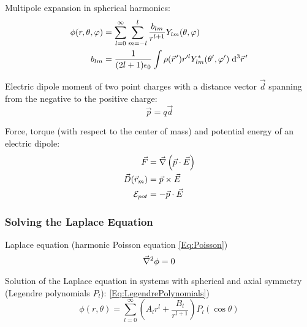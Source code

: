			\noindent
			Multipole expansion in spherical harmonics:
			\begin{equation}
				\begin{aligned}
					\phi(r,\theta,\varphi) &= \sum_{l=0}^{\infty}\sum_{m=-l}^{l} \frac{b_{lm}}{r^{l+1}}Y_{lm}(\theta,\varphi) \\
					b_{lm} &= \frac{1}{(2l+1)\epsilon_0}\int\rho(\pvec{r}')r'^lY^{*}_{lm}(\theta',\varphi')\;\diff^3\pvec{r}'
				\end{aligned}
			\end{equation}

			\noindent
			Electric dipole moment of two point charges with a distance vector $\vec{d}$ spanning from the negative to the positive charge:%
			\begin{equation}
				\vec{p}=q\vec{d}
			\end{equation}

			\noindent
			Force, torque (with respect to the center of mass) and potential energy of an electric dipole:%
			\begin{equation}
				\begin{aligned}
					\vec{F} &= \vec{\nabla}\left(\vec{p}\cdot\vec{E}\right) \\
					\vec{D}(\vec{r}_m) &= \vec{p}\times\vec{E} \\
					\mathcal{E}_{pot} &= -\vec{p}\cdot\vec{E} \\
				\end{aligned}
			\end{equation}

		\subsubsection{Solving the Laplace Equation}
			\noindent
			Laplace equation (harmonic Poisson equation \ref{Eq:Poisson})
			\begin{equation}
				\vec{\nabla}^2 \phi = 0
			\end{equation}

			\noindent
			Solution of the Laplace equation in systems with spherical and axial symmetry (Legendre polynomials $P_l$): \ref{Eq:LegendrePolynomials})%
			\begin{equation}
				\phi(r,\theta)=\sum_{l=0}^\infty \left(A_l r^l + \frac{B_l}{r^{l+1}}\right)P_l(\cos\theta)
			\end{equation}

